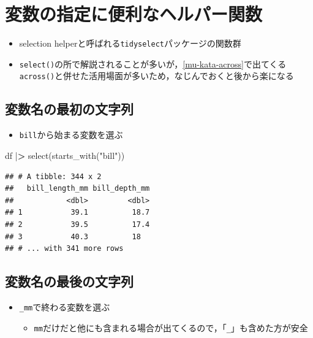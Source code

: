 \documentclass[
  xelatex,ja=standard, b5paper]{bxjsbook}
\newenvironment{Shaded}{\begin{snugshade}}{\end{snugshade}}
\newcommand{\ErrorTok}[1]{\textcolor[rgb]{0.64,0.00,0.00}{\textbf{#1}}}
\newcommand{\FunctionTok}[1]{\textcolor[rgb]{0.00,0.00,0.00}{#1}}
\newcommand{\NormalTok}[1]{#1}
\newcommand{\SpecialCharTok}[1]{\textcolor[rgb]{0.00,0.00,0.00}{#1}}
\newcommand{\StringTok}[1]{\textcolor[rgb]{0.31,0.60,0.02}{#1}}
\providecommand{\tightlist}{%
  \setlength{\itemsep}{0pt}\setlength{\parskip}{0pt}}
\begin{document}
\hypertarget{select-helper}{%
\section{変数の指定に便利なヘルパー関数}\label{select-helper}}

\begin{itemize}
\tightlist
\item
  selection helperと呼ばれる\texttt{tidyselect}パッケージの関数群
\item
  \texttt{select()}の所で解説されることが多いが，\ref{mu-kata-across}で出てくる\texttt{across()}と併せた活用場面が多いため，なじんでおくと後から楽になる
\end{itemize}

\hypertarget{select-helper1}{%
\subsection{変数名の最初の文字列}\label{select-helper1}}

\begin{itemize}
\tightlist
\item
  \texttt{bill}から始まる変数を選ぶ
\end{itemize}

\begin{Shaded}
\begin{Highlighting}[]
\NormalTok{df }\SpecialCharTok{|}\ErrorTok{\textgreater{}}
  \FunctionTok{select}\NormalTok{(}\FunctionTok{starts\_with}\NormalTok{(}\StringTok{"bill"}\NormalTok{))}
\end{Highlighting}
\end{Shaded}

\begin{verbatim}
## # A tibble: 344 x 2
##   bill_length_mm bill_depth_mm
##            <dbl>         <dbl>
## 1           39.1          18.7
## 2           39.5          17.4
## 3           40.3          18  
## # ... with 341 more rows
\end{verbatim}

\hypertarget{select-helper2}{%
\subsection{変数名の最後の文字列}\label{select-helper2}}

\begin{itemize}
\tightlist
\item
  \texttt{\_mm}で終わる変数を選ぶ

  \begin{itemize}
  \tightlist
  \item
    \texttt{mm}だけだと他にも含まれる場合が出てくるので，「\texttt{\_}」も含めた方が安全
  \end{itemize}
\end{itemize}
\end{document}
